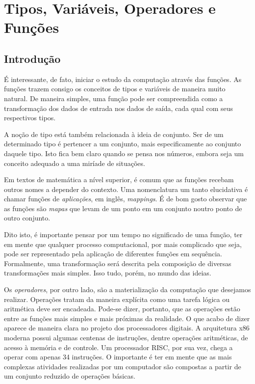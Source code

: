 \chapter{Tipos, Variáveis, Operadores e Funções}%

	\section*{Introdução}%
	É interessante, de fato, iniciar o estudo da computação através das funções. As funções trazem consigo os conceitos de tipos e variáveis de maneira muito natural. De maneira simples, uma função pode ser compreendida como a transformação dos dados de entrada nos dados de saída, cada qual com seus respectivos tipos. \par
	
	A noção de tipo está também relacionada à ideia de conjunto. Ser de um determinado tipo é pertencer a um conjunto, mais especificamente ao conjunto daquele tipo. Isto fica bem claro quando se pensa nos números, embora seja um conceito adequado a uma miríade de situações. \par
	
	Em textos de matemática a nível superior, é comum que as funções recebam outros nomes a depender do contexto. Uma nomenclatura um tanto elucidativa é chamar funções de \textit{aplicações}, em inglês, \textit{mappings}. É de bom gosto observar que as funções são \textit{mapas} que levam de um ponto em um conjunto noutro ponto de outro conjunto. \par

	Dito isto, é importante pensar por um tempo no significado de uma função, ter em mente que qualquer processo computacional, por mais complicado que seja, pode ser representado pela aplicação de diferentes funções em sequência. Formalmente, uma transformação será descrita pela composição de diversas transformações mais simples. Isso tudo, porém, no mundo das ideias. \par

	Os \textit{operadores}, por outro lado, são a materialização da computação que desejamos realizar. Operações tratam da maneira explícita como uma tarefa lógica ou aritmética deve ser encadeada. Pode-se dizer, portanto, que as operações estão entre as funções mais simples e mais próximas da realidade. O que acabo de dizer aparece de maneira clara no projeto dos processadores digitais. A arquitetura x86 moderna possui algumas centenas de instruções, dentre operações aritméticas, de acesso à memória e de controle. Um processador RISC, por sua vez, chega a operar com apenas 34 instruções\cite{arm:1995}. O importante é ter em mente que as mais complexas atividades realizadas por um computador são compostas a partir de um conjunto reduzido de operações básicas. \par

